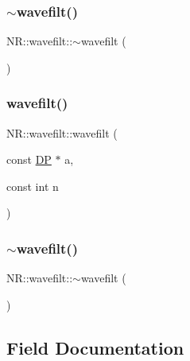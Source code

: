 \subsubsection{\texorpdfstring{$\sim$wavefilt()}{~wavefilt()}\hspace{0.1cm}{\footnotesize\ttfamily [1/2]}}
{\footnotesize\ttfamily N\+R\+::wavefilt\+::$\sim$wavefilt (\begin{DoxyParamCaption}{ }\end{DoxyParamCaption})\hspace{0.3cm}{\ttfamily [inline]}}

\mbox{\label{classNR_1_1wavefilt_aaa684e296af599915cdf4e0963b663c0}} 
\subsubsection{\texorpdfstring{wavefilt()}{wavefilt()}\hspace{0.1cm}{\footnotesize\ttfamily [2/2]}}
{\footnotesize\ttfamily N\+R\+::wavefilt\+::wavefilt (\begin{DoxyParamCaption}\item[{const \mbox{\hyperlink{namespaceNR_af6ff762dd605ff477b8e52387253a02a}{DP}} $\ast$}]{a,  }\item[{const int}]{n }\end{DoxyParamCaption})\hspace{0.3cm}{\ttfamily [inline]}}

\mbox{\label{classNR_1_1wavefilt_a9d223dd0fb637f3f511510b5efd9c6f6}} 
\subsubsection{\texorpdfstring{$\sim$wavefilt()}{~wavefilt()}\hspace{0.1cm}{\footnotesize\ttfamily [2/2]}}
{\footnotesize\ttfamily N\+R\+::wavefilt\+::$\sim$wavefilt (\begin{DoxyParamCaption}{ }\end{DoxyParamCaption})\hspace{0.3cm}{\ttfamily [inline]}}



\subsection{Field Documentation}
\mbox{\label{classNR_1_1wavefilt_aa4d0e1e40a8f4ea6f18f244241cca8d1}} 
